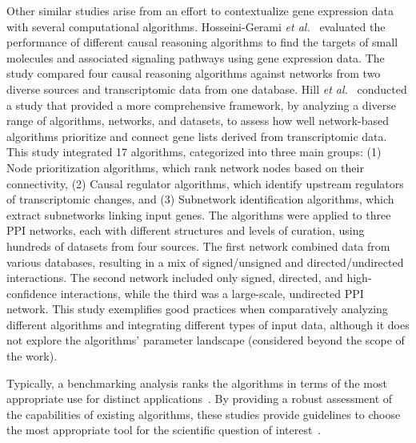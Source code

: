 Other similar studies arise from an effort to contextualize gene expression data with several computational algorithms.
Hosseini-Gerami \textit{et al.}~\cite{RN53} evaluated the performance of different causal reasoning algorithms to find the targets of small molecules and associated signaling pathways using gene expression data.
The study compared four causal reasoning algorithms against networks from two diverse sources and transcriptomic data from one database.
Hill \textit{et al.}~\cite{RN37} conducted a study that provided a more comprehensive framework, by analyzing a diverse range of algorithms, networks, and datasets, to assess how well network-based algorithms prioritize and connect gene lists derived from transcriptomic data.
This study integrated 17 algorithms, categorized into three main groups: (1) Node prioritization algorithms, which rank network nodes based on their connectivity, (2) Causal regulator algorithms, which identify upstream regulators of transcriptomic changes, and (3) Subnetwork identification algorithms, which extract subnetworks linking input genes.
The algorithms were applied to three \gls{PPI} networks, each with different structures and levels of curation, using hundreds of datasets from four sources.
The first network combined data from various databases, resulting in a mix of signed/unsigned and directed/undirected interactions.
The second network included only signed, directed, and high-confidence interactions, while the third was a large-scale, undirected \gls{PPI} network.
This study exemplifies good practices when comparatively analyzing different algorithms and integrating different types of input data, although it does not explore the algorithms' parameter landscape (considered beyond the scope of the work).

Typically, a benchmarking analysis ranks the algorithms in terms of the most appropriate use for distinct applications~\cite{RN37}.
By providing a robust assessment of the capabilities of existing algorithms, these studies provide guidelines to choose the most appropriate tool for the scientific question of interest~\cite{RN108}.
